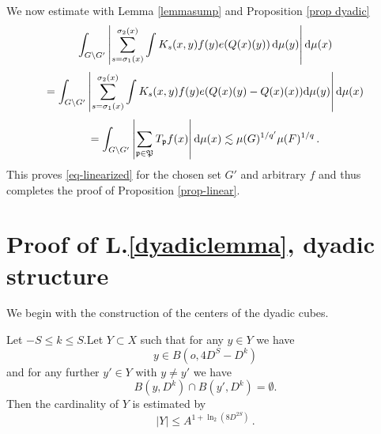 We now estimate with Lemma \ref{lemmasump} and Proposition \ref{prop dyadic}
\begin{equation}
    \int_{G \setminus G'} \left|\sum_{s={\sigma_1}(x)}^{{\sigma_2}(x)} \int K_s(x,y) f(y) e({Q}(x)(y))  \, \mathrm{d}\mu(y)\right| \mathrm{d}\mu(x)
\end{equation}
\begin{equation}
    =\int_{G \setminus G'} \left|\sum_{s={\sigma_1}(x)}^{{\sigma_2}(x)} \int K_s(x,y) f(y) e({Q}(x)(y) - {Q}(x)(x))\mathrm{d}\mu(y)\right| \mathrm{d}\mu(x)
\end{equation}
\begin{equation}
    =\int_{G \setminus G'} \left|\sum_{\mathfrak p\in \mathfrak P}T_{\mathfrak p} f(x)\right| \mathrm{d}\mu(x)
    \lesssim \mu(G)^{1/q'} \mu(F)^{1/q} \,.
\end{equation}
This proves \eqref{eq-linearized} for the chosen set $G'$ and arbitrary $f$ and thus completes the proof of Proposition
\ref{prop-linear}.



\section{Proof of L.\ref{dyadiclemma}, dyadic structure}
\label{subsecdyadic}

We begin with the construction of the centers of the dyadic cubes. 
\begin{lemma}\label{countballlemma}
Let $-S\le k\le S$.Let $Y\subset X$ such that for any $y\in Y$
we have
\begin{equation}\label{ybinb}
    y\in B(o,4D^S-D^k)
\end{equation}
and for any further $y'\in Y$ with $y\neq y'$ we have
\begin{equation} \label{eq disj yballs}
    B(y,D^k)\cap B(y',D^k)=\emptyset.
\end{equation}
Then  the cardinality of $Y$ is estimated by
\begin{equation}\label{boundY}
    |Y|\le A^{1+\ln_2(8D^{2S})}\, .
\end{equation}
\end{lemma}


